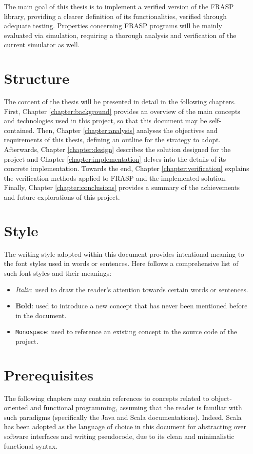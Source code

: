 The main goal of this thesis is to implement a verified version of the FRASP
library, providing a clearer definition of its functionalities, verified
through adequate testing. Properties concerning FRASP programs will be mainly
evaluated via simulation, requiring a thorough analysis and verification of the
current simulator as well.

\section{Structure}
\label{section:introduction:structure}

The content of the thesis will be presented in detail in the following
chapters. First, Chapter \ref{chapter:background} provides an overview of the
main concepts and technologies used in this project, so that this document may
be self-contained. Then, Chapter \ref{chapter:analysis} analyses the objectives
and requirements of this thesis, defining an outline for the strategy to adopt.
Afterwards, Chapter \ref{chapter:design} describes the solution designed for
the project and Chapter \ref{chapter:implementation} delves into the details of
its concrete implementation. Towards the end, Chapter
\ref{chapter:verification} explains the verification methods applied to FRASP
and the implemented solution. Finally, Chapter \ref{chapter:conclusions}
provides a summary of the achievements and future explorations of this project.

\section{Style}
\label{section:introduction:style}

The writing style adopted within this document provides intentional meaning to
the font styles used in words or sentences. Here follows a comprehensive list
of such font styles and their meanings:

\begin{itemize}
  \item \textit{Italic}: used to draw the reader's attention towards certain
        words or sentences.
  \item \textbf{Bold}: used to introduce a new concept that has never been
        mentioned before in the document.
  \item \texttt{Monospace}: used to reference an existing concept in the source
        code of the project.
\end{itemize}

\section{Prerequisites}
\label{section:introduction:prerequisites}

The following chapters may contain references to concepts related to
object-orient\-ed and functional programming, assuming that the reader is
familiar with such paradigms (specifically the Java \cite{Java} and Scala
\cite{Scala} documentations). Indeed, Scala has been adopted as the language of
choice in this document for abstracting over software interfaces and writing
pseudocode, due to its clean and minimalistic functional syntax.
